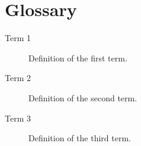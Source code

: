 
\chapter{Glossary}
\label{app:glossary}


\begin{description}
  \item[Term 1] Definition of the first term.
  \item[Term 2] Definition of the second term.
  \item[Term 3] Definition of the third term.
\end{description}
